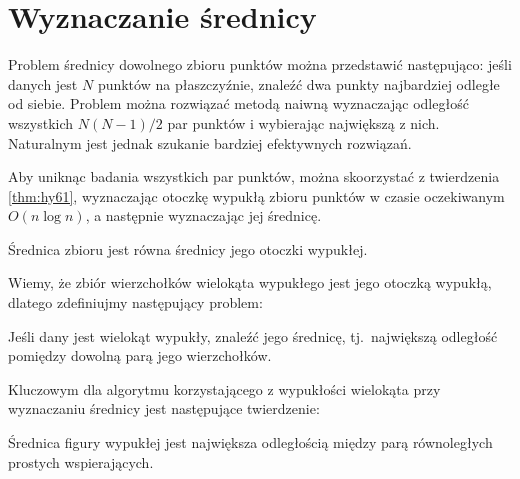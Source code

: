 \chapter{Wyznaczanie średnicy\label{chap:diameter}}
Problem średnicy dowolnego zbioru punktów można przedstawić
następująco: jeśli danych jest $N$ punktów na płaszczyźnie, znaleźć
dwa punkty najbardziej odległe od siebie. Problem można rozwiązać
metodą naiwną wyznaczając odległość wszystkich $N(N-1)/2$ par punktów
i wybierając największą z nich. Naturalnym jest jednak szukanie
bardziej efektywnych rozwiązań.

Aby uniknąc badania wszystkich par punktów, można skoorzystać z
twierdzenia \ref{thm:hy61}, wyznaczając otoczkę wypukłą zbioru
punktów w czasie oczekiwanym $O(n \log n)$, a następnie wyznaczając
jej średnicę.

\begin{twierdzenie}

  Średnica zbioru jest równa średnicy jego otoczki wypukłej.
\end{twierdzenie}

Wiemy, że zbiór wierzchołków wielokąta wypukłego jest jego otoczką
wypukłą, dlatego zdefiniujmy następujący problem:

\begin{problem}
  Jeśli dany jest wielokąt wypukły, znaleźć jego średnicę,
  tj.\ największą odległość pomiędzy dowolną parą jego wierzchołków.
\end{problem}



Kluczowym dla algorytmu korzystającego z wypukłości wielokąta przy
wyznaczaniu średnicy jest następujące twierdzenie:

\begin{twierdzenie}
\label{thm:yagbol}
  Średnica figury wypukłej jest największa odległością między parą
  równoległych prostych wspierających.
\end{twierdzenie}

